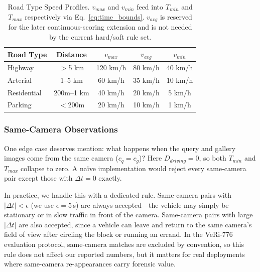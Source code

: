 \documentclass{ijitcs}
\newcommand{\rev}[1]{#1}
\begin{document}
\begin{table}[htbp]
\caption{\rev{Road Type Speed Profiles. $v_{max}$ and $v_{min}$ feed into $T_{min}$ and $T_{max}$ respectively via Eq.~\eqref{eq:time_bounds}. $v_{avg}$ is reserved for the later continuous-scoring extension and is not needed by the current hard/soft rule set.}}
\begin{center}
\begin{tabular}{|l|c|c|c|c|}
\hline
\textbf{Road Type} & \textbf{Distance} & \textbf{$v_{max}$} & \textbf{$v_{avg}$} & \textbf{$v_{min}$} \\
\hline
Highway & $>$5 km & 120 km/h & 80 km/h & 40 km/h \\
\hline
Arterial & 1--5 km & 60 km/h & 35 km/h & 10 km/h \\
\hline
Residential & 200m--1 km & 40 km/h & 20 km/h & 5 km/h \\
\hline
Parking & $<$200m & 20 km/h & 10 km/h & 1 km/h \\
\hline
\end{tabular}
\label{tab:speed_profiles}
\end{center}
\end{table}

\subsubsection{Same-Camera Observations}
One edge case deserves mention: what happens when the query and gallery images come from the same camera ($c_q = c_g$)? Here $D_{driving} = 0$, so both $T_{min}$ and $T_{max}$ collapse to zero. A na\"ive implementation would reject every same-camera pair except those with $\Delta t = 0$ exactly.

In practice, we handle this with a dedicated rule. Same-camera pairs with $|\Delta t| < \epsilon$ (we use $\epsilon = 5$\,s) are always accepted---the vehicle may simply be stationary or in slow traffic in front of the camera. Same-camera pairs with large $|\Delta t|$ are also accepted, since a vehicle can leave and return to the same camera's field of view after circling the block or running an errand. In the VeRi-776 evaluation protocol, same-camera matches are excluded by convention, so this rule does not affect our reported numbers, but it matters for real deployments where same-camera re-appearances carry forensic value.
\end{document}
